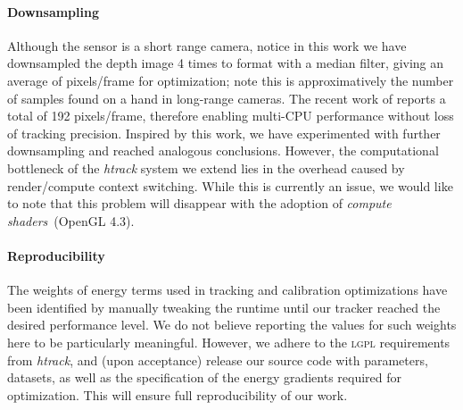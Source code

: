 \paragraph{Downsampling}
Although the \realsense{} sensor is a short range camera, notice in this work we have downsampled the depth image 4 times to  format with a median filter, giving an average of  pixels/frame for optimization; note this is approximatively the number of samples found on a hand in long-range cameras. The recent work of \cite{taylor2016concerto} reports a total of 192 pixels/frame, therefore enabling multi-CPU performance without loss of tracking precision. Inspired by this work, we have experimented with further downsampling and reached analogous conclusions. However, the computational bottleneck of the \emph{htrack} system we extend lies in the overhead caused by render/compute context switching. While this is currently an issue, we would like to note that this problem will disappear with the adoption of \emph{compute shaders}~(OpenGL 4.3).

\paragraph{Reproducibility}
% 
The weights of energy terms used in tracking and calibration optimizations have been identified by manually tweaking the runtime until our tracker reached the desired performance level. We do not believe reporting the values for such weights here to be particularly meaningful. However, we adhere to the \textsc{lgpl} requirements from \emph{htrack}, and (upon acceptance) release our source code with parameters, datasets, as well as the specification of the energy gradients required for optimization. This will ensure full reproducibility of our work.

